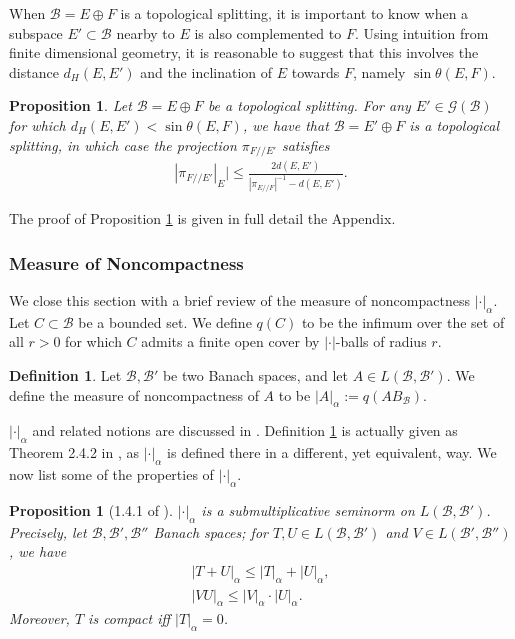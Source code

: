 \documentclass[11pt]{amsart}
\theoremstyle{theorem}
\newtheorem{prop}[thm]{Proposition}
\theoremstyle{definition}
\newtheorem{defn}[thm]{Definition}
\numberwithin{equation}{section}
\newcommand{\Gc}{\mathcal{G}}
\renewcommand{\a}{\alpha}
\newcommand{\Bc}{\mathcal{B}}
\newcommand{\ds}{/ \! /}
\begin{document}
When $\Bc = E \oplus F$ is a topological splitting, it is important to know when a subspace $E' \subset \Bc$ nearby to $E$ is also complemented to $F$. Using intuition from finite dimensional geometry, it is reasonable to suggest that this involves the distance $d_H(E, E')$ and the inclination of $E$ towards $F$, namely $\sin \theta(E, F)$.

\begin{prop} \label{prop:openCond}
Let $\Bc = E \oplus F$ be a topological splitting. For any $E' \in \Gc(\Bc)$ for which $d_H(E, E') < \sin \theta(E, F)$, we have that $\Bc = E' \oplus F$ is a topological splitting, in which case the projection $\pi_{F \ds E'}$ satisfies
\begin{align}\label{eq:graphNormEst}
|\pi_{F \ds E'}|_E| \leq \frac{2 d(E, E')}{|\pi_{E \ds F}|^{-1} - d(E, E')}.
\end{align}
\end{prop}
The proof of Proposition \ref{prop:openCond} is given in full detail the Appendix. 

\subsubsection{Measure of Noncompactness}

We close this section with a brief review of the measure of noncompactness $|\cdot|_{\a}$. Let $C \subset \Bc$ be a bounded set. We define $q(C)$ to be the infimum over the set of all $r > 0$ for which $C$ admits a finite open cover by $|\cdot|$-balls of radius $r$.

\begin{defn}\label{defn:measNoncompactness}
Let $\Bc, \Bc'$ be two Banach spaces, and let $A \in L(\Bc, \Bc')$. We define the measure of noncompactness of $A$ to be $|A|_{\a} := q(A B_{\Bc})$.
\end{defn}

$|\cdot|_{\a}$ and related notions are discussed in \cite{Akhmerov}. Definition \ref{defn:measNoncompactness} is actually given as Theorem 2.4.2 in \cite{Akhmerov}, as $|\cdot|_{\a}$ is defined there in a different, yet equivalent, way. We now list some of the properties of $|\cdot|_{\a}$.

\begin{prop}[1.4.1 of \cite{Akhmerov}] \label{prop:kuratowski}
$|\cdot|_{\a}$ is a submultiplicative seminorm on $L(\Bc, \Bc')$. Precisely, let $\Bc, \Bc', \Bc''$ Banach spaces; for $T, U \in L(\Bc, \Bc')$ and $V \in L(\Bc', \Bc'')$, we have
\begin{gather*}
|T + U|_{\a} \leq |T|_{\a} + |U|_{\a}, \\
|V U|_{\a} \leq |V|_{\a} \cdot |U|_{\a}.
\end{gather*}
Moreover, $T$ is compact iff $|T|_{\a}= 0$.
\end{prop}
\end{document}

